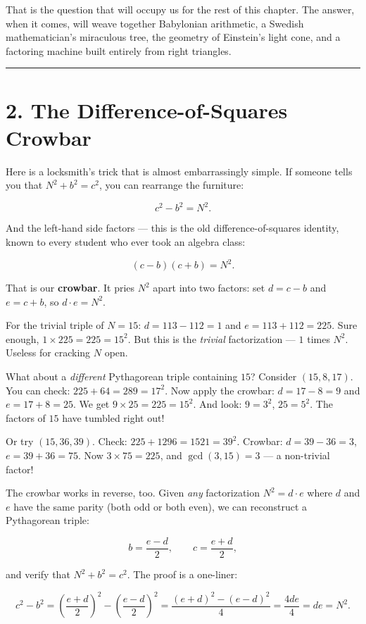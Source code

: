 That is the question that will occupy us for the rest of this chapter. The answer, when it comes, will weave together Babylonian arithmetic, a Swedish mathematician's miraculous tree, the geometry of Einstein's light cone, and a factoring machine built entirely from right triangles.

\bigskip\noindent\rule{\linewidth}{0.4pt}\bigskip

\section{2. The Difference-of-Squares Crowbar}
Here is a locksmith's trick that is almost embarrassingly simple. If someone tells you that \(N^2 + b^2 = c^2\), you can rearrange the furniture:

\[c^2 - b^2 = N^2.\]

And the left-hand side factors --- this is the old difference-of-squares identity, known to every student who ever took an algebra class:

\[(c - b)(c + b) = N^2.\]

That is our \textbf{crowbar}. It pries \(N^2\) apart into two factors: set \(d = c - b\) and \(e = c + b\), so \(d \cdot e = N^2\).

For the trivial triple of \(N = 15\): \(d = 113 - 112 = 1\) and \(e = 113 + 112 = 225\). Sure enough, \(1 \times 225 = 225 = 15^2\). But this is the \emph{trivial} factorization --- \(1\) times \(N^2\). Useless for cracking \(N\) open.

What about a \emph{different} Pythagorean triple containing \(15\)? Consider \((15, 8, 17)\). You can check: \(225 + 64 = 289 = 17^2\). Now apply the crowbar: \(d = 17 - 8 = 9\) and \(e = 17 + 8 = 25\). We get \(9 \times 25 = 225 = 15^2\). And look: \(9 = 3^2\), \(25 = 5^2\). The factors of \(15\) have tumbled right out!

Or try \((15, 36, 39)\). Check: \(225 + 1296 = 1521 = 39^2\). Crowbar: \(d = 39 - 36 = 3\), \(e = 39 + 36 = 75\). Now \(3 \times 75 = 225\), and \(\gcd(3, 15) = 3\) --- a non-trivial factor!

The crowbar works in reverse, too. Given \emph{any} factorization \(N^2 = d \cdot e\) where \(d\) and \(e\) have the same parity (both odd or both even), we can reconstruct a Pythagorean triple:

\[b = \frac{e - d}{2}, \qquad c = \frac{e + d}{2},\]

and verify that \(N^2 + b^2 = c^2\). The proof is a one-liner:

\[c^2 - b^2 = \left(\frac{e+d}{2}\right)^{\!2} - \left(\frac{e-d}{2}\right)^{\!2} = \frac{(e+d)^2 - (e-d)^2}{4} = \frac{4de}{4} = de = N^2.\]

